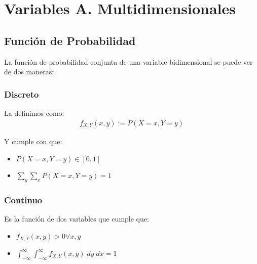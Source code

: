 \documentclass[12pt, fleqn]{report}                             %
\theoremstyle{break}                                            %
\newcommand{\inftyInt} {\int_{-\infty}^{\infty}}                %
\begin{document}
    \chapter{Variables A. Multidimensionales}


        \clearpage
        \section{Función de Probabilidad}

            La función de probabilidad conjunta de una variable bidimensional se puede ver de dos
            maneras:

            \vspace{1em}
            \subsection{Discreto}

                La definimos como:
                \begin{align*}
                    f_{X, Y}(x, y) := P(X = x, Y = y)
                \end{align*}

                Y cumple con que:
                \begin{itemize}
                    \item $P(X = x, Y = y) \in [0, 1]$
                    \item $\displaystyle \sum_y \sum_x P(X = x, Y = y) = 1$ 
                \end{itemize}

            \vspace{1em}
            \subsection{Continuo}

                Es la función de dos variables que cumple que:
                \begin{itemize}
                    \item $f_{X, Y}(x, y) > 0 \forall x, y$
                    \item $\displaystyle \inftyInt \inftyInt f_{X, Y}(x, y) \; dy \; dx = 1$ 
                \end{itemize}
\end{document}
